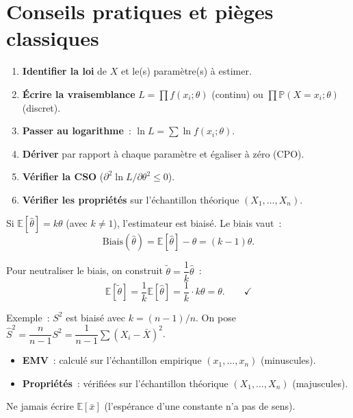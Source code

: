 \documentclass[11pt,a4paper]{article}
\newcommand{\E}{\mathbb{E}}
\newcommand{\Prob}{\mathbb{P}}
\renewcommand{\P}{\Prob}
\newcommand{\biais}[1]{\mathrm{Biais}(#1)}
\begin{document}
\newpage
\section{Conseils pratiques et pi\`eges classiques}

\begin{methbox}
\begin{enumerate}
  \item \textbf{Identifier la loi} de $X$ et le(s) param\`etre(s) \`a estimer.
  \item \textbf{\'Ecrire la vraisemblance} $L = \prod f(x_i;\theta)$ (continu) ou $\prod \P(X=x_i;\theta)$ (discret).
  \item \textbf{Passer au logarithme}~: $\ln L = \sum\ln f(x_i;\theta)$.
  \item \textbf{D\'eriver} par rapport \`a chaque param\`etre et \'egaliser \`a z\'ero (CPO).
  \item \textbf{V\'erifier la CSO} ($\partial^2\ln L/\partial\theta^2\leq 0$).
  \item \textbf{V\'erifier les propri\'et\'es} sur l'\'echantillon th\'eorique $(X_1,\ldots,X_n)$.
\end{enumerate}
\end{methbox}

\begin{methbox}
Si $\E[\hat\theta]=k\theta$ (avec $k\neq 1$), l'estimateur est biais\'e. Le biais vaut~:
$$\biais{\hat\theta} = \E[\hat\theta]-\theta = (k-1)\theta.$$

Pour neutraliser le biais, on construit $\tilde\theta = \dfrac{1}{k}\hat\theta$~:
$$\E[\tilde\theta] = \frac{1}{k}\E[\hat\theta] = \frac{1}{k}\cdot k\theta = \theta.\qquad\checkmark$$

Exemple~: $S^2$ est biais\'e avec $k=(n-1)/n$. On pose $\hat S^2=\dfrac{n}{n-1}S^2=\dfrac{1}{n-1}\sum(X_i-\bar X)^2$.
\end{methbox}

\begin{alertbox}
\begin{itemize}
  \item \textbf{EMV}~: calcul\'e sur l'\'echantillon empirique $(x_1,\ldots,x_n)$ (minuscules).
  \item \textbf{Propri\'et\'es}~: v\'erifi\'ees sur l'\'echantillon th\'eorique $(X_1,\ldots,X_n)$ (majuscules).
\end{itemize}
Ne jamais \'ecrire $\E[\bar x]$ (l'esp\'erance d'une constante n'a pas de sens).
\end{alertbox}
\end{document}

